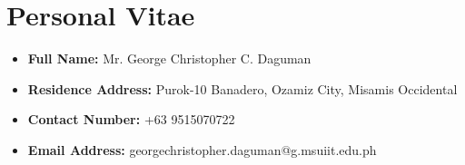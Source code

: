 \chapter{Personal Vitae}

\begin{itemize}
    \item \textbf{Full Name:} Mr. George Christopher C. Daguman
    \item \textbf{Residence Address:} Purok-10 Banadero, Ozamiz City, Misamis Occidental
    \item \textbf{Contact Number:} +63 9515070722
    \item \textbf{Email Address:} georgechristopher.daguman@g.msuiit.edu.ph
\end{itemize}
